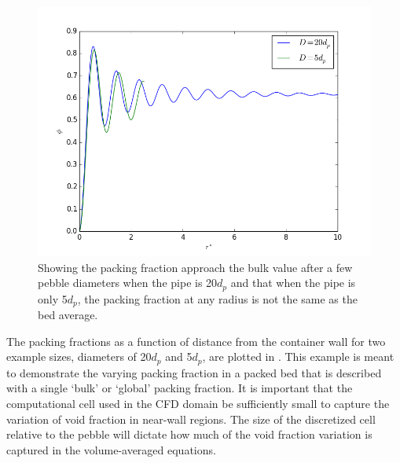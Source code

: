\begin{figure}[htbp]
\centering
	\includegraphics[width = \singleimagewidth]{figures/annular-packing-fraction.png}
	\caption{Showing the packing fraction approach the bulk value after a few pebble diameters when the pipe is 20$d_p$ and that when the pipe is only 5$d_p$, the packing fraction at any radius is not the same as the bed average.}
	\label{fig:packingDist}
\end{figure}

The packing fractions as a function of distance from the container wall for two example sizes, diameters of 20$d_p$ and 5$d_p$, are plotted in . This example is meant to demonstrate the varying packing fraction in a packed bed that is described with a single `bulk' or `global' packing fraction. It is important that the computational cell used in the CFD domain be sufficiently small to capture the variation of void fraction in near-wall regions. The size of the discretized cell relative to the pebble will dictate how much of the void fraction variation is captured in the volume-averaged equations.




\FloatBarrier



